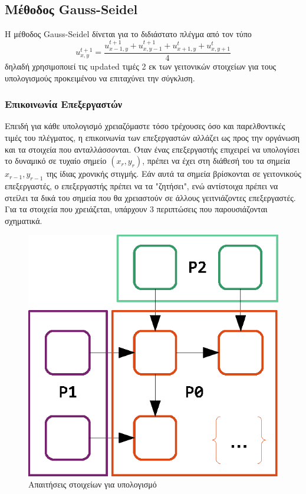 \documentclass[11pt,a4paper]{article}
\begin{document}
\clearpage
\subsection{Μέθοδος Gauss-Seidel}
Η μέθοδος Gauss-Seidel δίνεται για το διδιάστατο πλέγμα από τον τύπο
\[ u_{x,y}^{t+1} = \frac{u_{x-1,y}^{t+1} + u_{x,y-1}^{t+1} + u_{x+1, y}^t + u_{x, y+1}^t}{4} \]
δηλαδή χρησιμοποιεί τις updated τιμές 2 εκ των γειτονικών στοιχείων για τους υπολογισμούς προκειμένου να επιταχύνει την σύγκλιση. 
\subsubsection{Επικοινωνία Επεξεργαστών}
Επειδή για κάθε υπολογισμό χρειαζόμαστε τόσο τρέχουσες όσο και παρελθοντικές τιμές του πλέγματος, η επικοινωνία των επεξεργαστών αλλάζει ως προς την οργάνωση και τα στοιχεία που ανταλλάσσονται. Όταν ένας επεξεργαστής επιχειρεί να υπολογίσει το δυναμικό σε τυχαίο σημείο $(x_r, y_r)$, πρέπει να έχει στη διάθεσή του τα σημεία $x_{r-1}, y_{r-1}$ της ίδιας χρονικής στιγμής. Εάν αυτά τα σημεία βρίσκονται σε γειτονικούς επεξεργαστές, ο επεξεργαστής πρέπει να τα "ζητήσει", ενώ αντίστοιχα πρέπει να στείλει τα δικά του σημεία που θα χρειαστούν σε άλλους γειτνιάζοντες επεξεργαστές. Για τα στοιχεία που χρειάζεται, υπάρχουν 3 περιπτώσεις που παρουσιάζονται σχηματικά. \\
\begin{figure}[h]
\centering
\includegraphics[scale=0.6]{gaussSeidelPull.eps}
\caption{Απαιτήσεις στοιχείων για υπολογισμό}
\end{figure}
\end{document}
